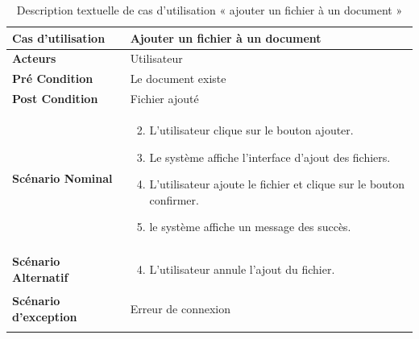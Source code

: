\begin{longtable}{|p{5cm}|p{10cm}|}
\hline
\textbf{Cas d'utilisation}&Ajouter un fichier à un document\\
\hline
\textbf{Acteurs}&Utilisateur\\
\hline
\textbf{Pré Condition}&Le document existe\\
\hline
\textbf{Post Condition}&Fichier ajouté\\
\hline
\textbf{Scénario Nominal}&
\vspace{-\baselineskip}
\begin{enumerate}
    \setcounter{enumi}{1}
    \item L'utilisateur clique sur le bouton ajouter.
    \item Le système affiche l'interface d'ajout des fichiers.
    \item L'utilisateur ajoute le fichier et clique sur le bouton confirmer.
    \item le système affiche un message des succès.
    
    
\end{enumerate}\\
\hline
\textbf{Scénario Alternatif}&
\vspace{-\baselineskip}
\begin{enumerate}
    \setcounter{enumi}{3}
    \item L'utilisateur annule l'ajout du fichier.
\end{enumerate}\\
\hline
\textbf{Scénario d'exception}&Erreur de connexion\\
\hline
\caption{Description textuelle de cas d'utilisation « ajouter un fichier à un document »}
\label{tab:DescriptionTextuelleDeCasDUtilisationAjouterUnFichierAUnDocument}

\end{longtable}



    
